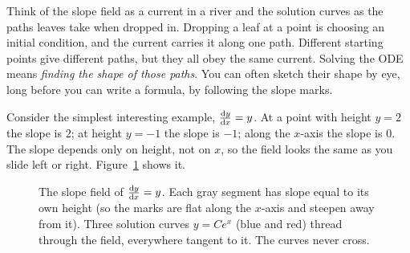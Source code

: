 \begin{intuitionbox}
Think of the slope field as a current in a river and the solution curves as the
paths leaves take when dropped in. Dropping a leaf at a point is choosing an
initial condition, and the current carries it along one path. Different
starting points give different paths, but they all obey the same current. Solving
the ODE means \emph{finding the shape of those paths}. You can often sketch their
shape by eye, long before you can write a formula, by following the slope marks.
\end{intuitionbox}

Consider the simplest interesting example, $\frac{\mathrm{d} y}{\mathrm{d} x} = y$. At a point with height
$y=2$ the slope is $2$; at height $y=-1$ the slope is $-1$; along the $x$-axis the
slope is $0$. The slope depends only on height, not on $x$, so the field looks the
same as you slide left or right. Figure~\ref{ch37:slopefield-exp} shows it.

\begin{figure}[htbp]
\centering
{}
\caption{The slope field of $\frac{\mathrm{d} y}{\mathrm{d} x}=y$. Each gray segment has slope equal to its
own height (so the marks are flat along the $x$-axis and steepen away from it).
Three solution curves $y=Ce^{x}$ (blue and red) thread through the field, everywhere
tangent to it. The curves never cross.}
\label{ch37:slopefield-exp}
\end{figure}

